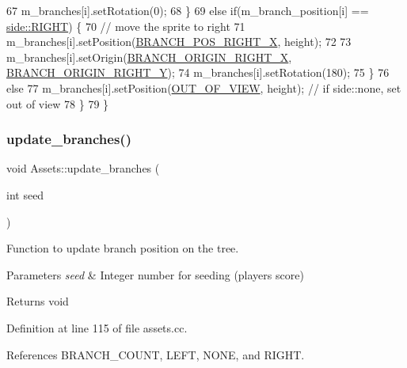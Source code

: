 \begin{DoxyCode}
67             m\_branches[i].setRotation(0);
68         \}
69         \textcolor{keywordflow}{else} \textcolor{keywordflow}{if}(m\_branch\_position[i] == \hyperlink{assets_8h_afc015eff6557e84151d2e53b94375445a21507b40c80068eda19865706fdc2403}{side::RIGHT}) \{
70             \textcolor{comment}{// move the sprite to right}
71             m\_branches[i].setPosition(\hyperlink{assets_8h_a7e1f655f0634e82d9007b79d99fb4ad7}{BRANCH\_POS\_RIGHT\_X}, height);
72 
73             m\_branches[i].setOrigin(\hyperlink{assets_8h_a8221d61633fb61c05bcaa12c4a690399}{BRANCH\_ORIGIN\_RIGHT\_X}, 
      \hyperlink{assets_8h_a787097203a7dc54361d705bf1a435568}{BRANCH\_ORIGIN\_RIGHT\_Y});
74             m\_branches[i].setRotation(180);
75         \}
76         \textcolor{keywordflow}{else}
77             m\_branches[i].setPosition(\hyperlink{assets_8h_a42b3027df9eba88a0de54ff48374cd8a}{OUT\_OF\_VIEW}, height); \textcolor{comment}{// if side::none, set out of view}
78     \}
79 \}
\end{DoxyCode}
\mbox{\label{class_assets_a760a66396019d539c1f129134e1eeaa2}} 
\subsubsection{\texorpdfstring{update\+\_\+branches()}{update\_branches()}}
{\footnotesize\ttfamily void Assets\+::update\+\_\+branches (\begin{DoxyParamCaption}\item[{int}]{seed }\end{DoxyParamCaption})}



Function to update branch position on the tree. 


\begin{DoxyParams}{Parameters}
{\em seed} & Integer number for seeding (player\textquotesingle{}s score) \\
\hline
\end{DoxyParams}
\begin{DoxyReturn}{Returns}
void 
\end{DoxyReturn}


Definition at line 115 of file assets.\+cc.



References B\+R\+A\+N\+C\+H\+\_\+\+C\+O\+U\+NT, L\+E\+FT, N\+O\+NE, and R\+I\+G\+HT.



